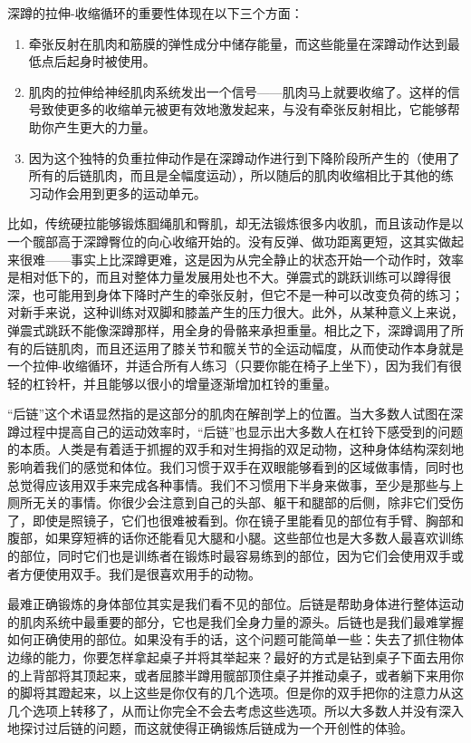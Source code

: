 深蹲的拉伸-收缩循环的重要性体现在以下三个方面：

\begin{enumerate}
    \item 牵张反射在肌肉和筋膜的弹性成分中储存能量，而这些能量在深蹲动作达到最低点后起身时被使用。
    \item 肌肉的拉伸给神经肌肉系统发出一个信号——肌肉马上就要收缩了。这样的信号致使更多的收缩单元被更有效地激发起来，与没有牵张反射相比，它能够帮助你产生更大的力量。
    \item 因为这个独特的负重拉伸动作是在深蹲动作进行到下降阶段所产生的（使用了所有的后链肌肉，而且是全幅度运动），所以随后的肌肉收缩相比于其他的练习动作会用到更多的运动单元。
\end{enumerate}

比如，传统硬拉能够锻炼腘绳肌和臀肌，却无法锻炼很多内收肌，而且该动作是以一个髋部高于深蹲臀位的向心收缩开始的。没有反弹、做功距离更短，这其实做起来很难——事实上比深蹲更难，这是因为从完全静止的状态开始一个动作时，效率是相对低下的，而且对整体力量发展用处也不大。弹震式的跳跃训练可以蹲得很深，也可能用到身体下降时产生的牵张反射，但它不是一种可以改变负荷的练习；对新手来说，这种训练对双脚和膝盖产生的压力很大。此外，从某种意义上来说，弹震式跳跃不能像深蹲那样，用全身的骨骼来承担重量。相比之下，深蹲调用了所有的后链肌肉，而且还运用了膝关节和髋关节的全运动幅度，从而使动作本身就是一个拉伸-收缩循环，并适合所有人练习（只要你能在椅子上坐下），因为我们有很轻的杠铃杆，并且能够以很小的增量逐渐增加杠铃的重量。

“后链”这个术语显然指的是这部分的肌肉在解剖学上的位置。当大多数人试图在深蹲过程中提高自己的运动效率时，“后链”也显示出大多数人在杠铃下感受到的问题的本质。人类是有着适于抓握的双手和对生拇指的双足动物，这种身体结构深刻地影响着我们的感觉和体位。我们习惯于双手在双眼能够看到的区域做事情，同时也总觉得应该用双手来完成各种事情。我们不习惯用下半身来做事，至少是那些与上厕所无关的事情。你很少会注意到自己的头部、躯干和腿部的后侧，除非它们受伤了，即使是照镜子，它们也很难被看到。你在镜子里能看见的部位有手臂、胸部和腹部，如果穿短裤的话你还能看见大腿和小腿。这些部位也是大多数人最喜欢训练的部位，同时它们也是训练者在锻炼时最容易练到的部位，因为它们会使用双手或者方便使用双手。我们是很喜欢用手的动物。

最难正确锻炼的身体部位其实是我们看不见的部位。后链是帮助身体进行整体运动的肌肉系统中最重要的部分，它也是我们全身力量的源头。后链也是我们最难掌握如何正确使用的部位。如果没有手的话，这个问题可能简单一些：失去了抓住物体边缘的能力，你要怎样拿起桌子并将其举起来？最好的方式是钻到桌子下面去用你的上背部将其顶起来，或者屈膝半蹲用髋部顶住桌子并推动桌子，或者躺下来用你的脚将其蹬起来，以上这些是你仅有的几个选项。但是你的双手把你的注意力从这几个选项上转移了，从而让你完全不会去考虑这些选项。所以大多数人并没有深入地探讨过后链的问题，而这就使得正确锻炼后链成为一个开创性的体验。

